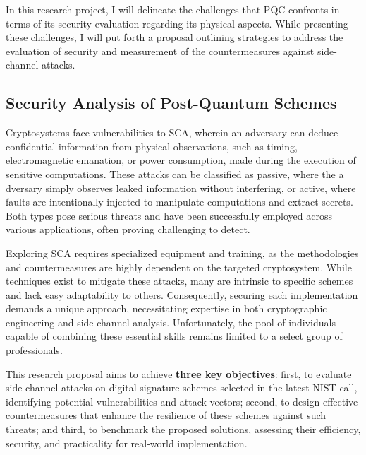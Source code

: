 \documentclass[11pt, a4paper]{article}
\begin{document}
In this research project, I will delineate the challenges that PQC confronts 
in terms of its security evaluation regarding its physical aspects. While presenting these challenges, 
I will put forth a proposal outlining strategies to address the evaluation of security and measurement of 
the countermeasures against side-channel attacks. 

\subsection*{Security Analysis of Post-Quantum Schemes}\label{sec:an}\vspace{-0.1cm}

Cryptosystems face vulnerabilities to SCA, wherein an adversary can deduce 
confidential information from physical observations, such as timing,
electromagnetic emanation, or power consumption, made during the execution of 
sensitive computations. These attacks can be classified as passive, where the a
dversary simply observes leaked information without interfering, or active, 
where faults are intentionally injected to manipulate computations and extract 
secrets. Both types pose serious threats and have been successfully employed 
across various applications, often proving challenging to detect.

Exploring SCA requires specialized equipment and training, as the 
methodologies and countermeasures are highly dependent on the targeted 
cryptosystem. While techniques exist to mitigate these attacks, many are 
intrinsic to specific schemes and lack easy adaptability to others. Consequently, 
securing each implementation demands a unique approach, necessitating 
expertise in both cryptographic engineering and side-channel analysis. 
Unfortunately, the pool of individuals capable of combining these
essential skills remains limited to a select group of professionals.


This research proposal aims to achieve \textbf{three key objectives}: first, to 
evaluate side-channel attacks on digital signature schemes selected in the latest NIST 
call, identifying potential vulnerabilities and attack vectors; second, to 
design effective countermeasures that enhance the resilience of these schemes 
against such threats; and third, to benchmark the proposed solutions, assessing 
their efficiency, security, and practicality for real-world implementation.
\end{document}
